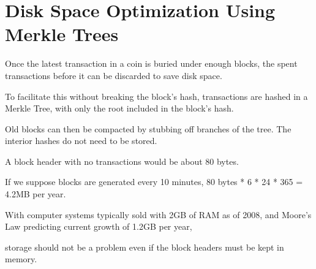 \section{Disk Space Optimization Using Merkle Trees}

Once the latest transaction in a coin is buried under enough blocks, the spent transactions before it can be discarded to save disk space.

To facilitate this without breaking the block's hash, transactions are hashed in a Merkle Tree, with only the root included in the block's hash.

Old blocks can then be compacted by stubbing off branches of the tree. The interior hashes do not need to be stored.

A block header with no transactions would be about 80 bytes.

If we suppose blocks are generated every 10 minutes, 80 bytes * 6 * 24 * 365 = 4.2MB per year.

With computer systems typically sold with 2GB of RAM as of 2008, and Moore's Law predicting current growth of 1.2GB per year,

storage should not be a problem even if the block headers must be kept in memory.